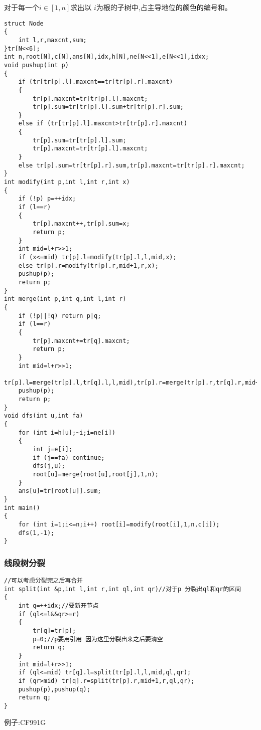 \documentclass[a4paper]{ctexart}
\begin{document}
对于每一个$i\in[1,n]$求出以 $i$为根的子树中,占主导地位的颜色的编号和。
\begin{lstlisting}
struct Node
{
	int l,r,maxcnt,sum;
}tr[N<<6];
int n,root[N],c[N],ans[N],idx,h[N],ne[N<<1],e[N<<1],idxx;
void pushup(int p)
{
	if (tr[tr[p].l].maxcnt==tr[tr[p].r].maxcnt)
	{
		tr[p].maxcnt=tr[tr[p].l].maxcnt;
		tr[p].sum=tr[tr[p].l].sum+tr[tr[p].r].sum;
	}
	else if (tr[tr[p].l].maxcnt>tr[tr[p].r].maxcnt)
	{
		tr[p].sum=tr[tr[p].l].sum;
		tr[p].maxcnt=tr[tr[p].l].maxcnt;
	}
	else tr[p].sum=tr[tr[p].r].sum,tr[p].maxcnt=tr[tr[p].r].maxcnt;
}
int modify(int p,int l,int r,int x)
{
	if (!p) p=++idx;
	if (l==r)
	{
		tr[p].maxcnt++,tr[p].sum=x;
		return p;
	}
	int mid=l+r>>1;
	if (x<=mid) tr[p].l=modify(tr[p].l,l,mid,x);
	else tr[p].r=modify(tr[p].r,mid+1,r,x);
	pushup(p);
	return p;
}
int merge(int p,int q,int l,int r)
{
	if (!p||!q) return p|q;
	if (l==r)
	{
		tr[p].maxcnt+=tr[q].maxcnt;
		return p;
	}
	int mid=l+r>>1;
	tr[p].l=merge(tr[p].l,tr[q].l,l,mid),tr[p].r=merge(tr[p].r,tr[q].r,mid+1,r);
	pushup(p);
	return p;
}
void dfs(int u,int fa)
{
	for (int i=h[u];~i;i=ne[i])
	{
		int j=e[i];
		if (j==fa) continue;
		dfs(j,u);
		root[u]=merge(root[u],root[j],1,n);
	}
	ans[u]=tr[root[u]].sum;
}
int main()
{
	for (int i=1;i<=n;i++) root[i]=modify(root[i],1,n,c[i]);
	dfs(1,-1);
}
\end{lstlisting}

\subsubsection{线段树分裂}
\begin{lstlisting}
//可以考虑分裂完之后再合并
int split(int &p,int l,int r,int ql,int qr)//对于p 分裂出ql和qr的区间
{
	int q=++idx;//要新开节点
	if (ql<=l&&qr>=r)
	{
		tr[q]=tr[p];
		p=0;//p要用引用 因为这里分裂出来之后要清空
		return q;
	}
	int mid=l+r>>1;
	if (ql<=mid) tr[q].l=split(tr[p].l,l,mid,ql,qr);
	if (qr>mid) tr[q].r=split(tr[p].r,mid+1,r,ql,qr);
	pushup(p),pushup(q);
	return q;
}

\end{lstlisting}
例子:CF991G
\end{document}
